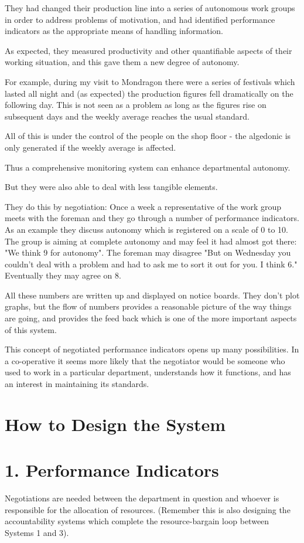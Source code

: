 They had changed their production line into a series of autonomous work groups in order to address problems of motivation, and had identified performance indicators as the appropriate means of handling information.

As expected, they measured productivity and other quantifiable aspects of their working situation, and this gave them a new degree of autonomy.

For example, during my visit to Mondragon there were a series of festivals which lasted all night and (as expected) the production figures fell dramatically on the following day. This is not seen as a problem as long as the figures rise on subsequent days and the weekly average reaches the usual standard.

All of this is under the control of the people on the shop floor - the algedonic is only generated if the weekly average is affected.

Thus a comprehensive monitoring system can enhance departmental autonomy.

But they were also able to deal with less tangible elements.

They do this by negotiation: Once a week a representative of the work group meets with the foreman and they go through a number of performance indicators. As an example they discuss autonomy which is registered on a scale of 0 to 10. The group is aiming at complete autonomy and may feel it had almost got there: "We think 9 for autonomy". The foreman may disagree "But on Wednesday you couldn't deal with a problem and had to ask me to sort it out for you. I think 6." Eventually they may agree on 8.

All these numbers are written up and displayed on notice boards. They don't plot graphs, but the flow of numbers provides a reasonable picture of the way things are going, and provides the feed back which is one of the more important aspects of this system.

This concept of negotiated performance indicators opens up many possibilities. In a co-operative it seems more likely that the negotiator would be someone who used to work in a particular department, understands how it functions, and has an interest in maintaining its standards.

\section*{How to Design the System}

\section*{1. Performance Indicators}
Negotiations are needed between the department in question and whoever is responsible for the allocation of resources. (Remember this is also designing the accountability systems which complete the resource-bargain loop between Systems 1 and 3).

